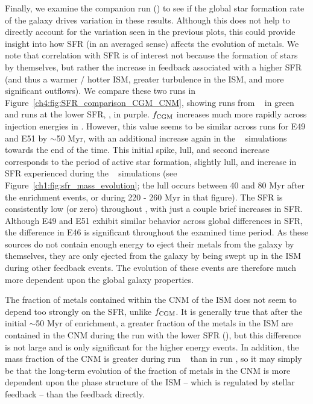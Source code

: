Finally, we examine the companion run (\runtwonu) to see if the global star formation rate of the galaxy drives variation in these results. Although this does not help to directly account for the variation seen in the previous plots, this could provide insight into how SFR (in an averaged sense) affects the evolution of metals. We note that correlation with SFR is of interest not because the formation of stars by themselves, but rather the increase in feedback associated with a higher SFR (and thus a warmer / hotter ISM, greater turbulence in the ISM, and more significant outflows). We compare these two runs in Figure~\ref{ch4:fig:SFR_comparison_CGM_CNM}, showing runs from \runonenu~ in green and runs at the lower SFR, \runtwonu, in purple. $f_{\rm CGM}$ increases much more rapidly across injection energies in \runonenu. However, this value seems to be similar across runs for E49 and E51 by $\sim$50 Myr, with an additional increase again in the \runonenu~ simulations towards the end of the time. This initial spike, lull, and second increase corresponds to the period of active star formation, slightly lull, and increase in SFR experienced during the \runonenu~ simulations (see Figure~\ref{ch1:fig:sfr_mass_evolution}; the lull occurs between 40 and 80 Myr after the enrichment events, or during 220 - 260 Myr in that figure). The SFR is consistently low (or zero) throughout \runtwonu, with just a couple brief increases in SFR. Although E49 and E51 exhibit similar behavior across global differences in SFR, the difference in E46 is significant throughout the examined time period. As these sources do not contain enough energy to eject their metals from the galaxy by themselves, they are only ejected from the galaxy by being swept up in the ISM during other feedback events. The evolution of these events are therefore much more dependent upon the global galaxy properties.

The fraction of metals contained within the CNM of the ISM does not seem to depend too strongly on the SFR, unlike $f_{\rm CGM}$. It is generally true that after the initial $\sim$50 Myr of enrichment, a greater fraction of the metals in the ISM are contained in the CNM during the run with the lower SFR (\runtwonu), but this difference is not large and is only significant for the higher energy events. In addition, the mass fraction of the CNM is greater during run \runtwonu~ than in run \runonenu, so it may simply be that the long-term evolution of the fraction of metals in the CNM is more dependent upon the phase structure of the ISM -- which is regulated by stellar feedback -- than the feedback directly.

